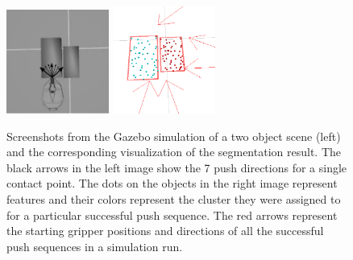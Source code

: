 \begin{figure}[h!]
  \begin{center}
    \includegraphics[width=0.3\textwidth]{figures/push_directions.pdf}  
    \includegraphics[width=0.3\textwidth]{figures/rviz_empty9_crop.pdf} 
    \caption{Screenshots from  the Gazebo  simulation of a  two object
      scene (left)   and  the   corresponding  visualization   of  the
      segmentation result. The black arrows in the left image show the
      7 push  directions for a single  contact point. The  dots on the
      objects in  the right image represent features  and their colors
      represent  the cluster they  were assigned  to for  a particular
      successful push sequence. The red arrows represent the starting gripper positions
      and  directions  of  all  the  successful push  sequences  in  a
      simulation run. }
         \label{fig:simulations}
  \end{center}
\end{figure}

